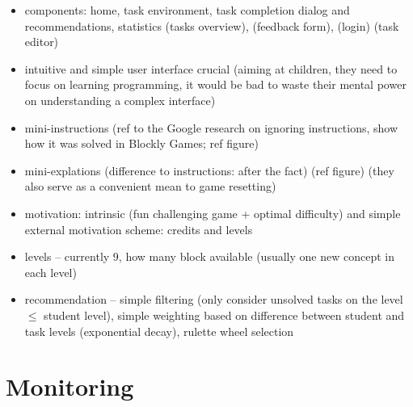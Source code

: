 \begin{itemize}
\item components: home, task environment, task completion dialog and recommendations, statistics (tasks overview), (feedback form), (login) (task editor)
\item intuitive and simple user interface crucial (aiming at children, they need to focus on learning programming, it would be bad to waste their mental power on understanding a complex interface)
\item mini-instructions (ref to the Google research on ignoring instructions, show how it was solved in Blockly Games; ref figure)
\item mini-explations (difference to instructions: after the fact) (ref figure) (they also serve as a convenient mean to game resetting)
\item motivation: intrinsic (fun challenging game + optimal difficulty) and simple external motivation scheme: credits and levels
\item levels -- currently 9, how many block available (usually one new concept in each level)
\item recommendation -- simple filtering (only consider unsolved tasks on the level $\leq$ student level), simple weighting based on difference between student and task levels (exponential decay), rulette wheel selection
\end{itemize}





\section{Monitoring}
\label{sec:robomission.monitoring}

